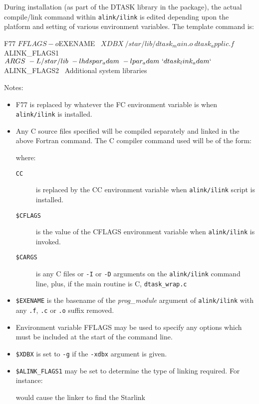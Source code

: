 \documentclass[twoside,11pt,nolof]{starlink}
\begin{document}
During installation (as part of the DTASK library in the
package), the actual compile/link command within \texttt{alink/ilink} is edited
depending upon the platform and setting of various environment variables.
The template command is:
\begin{terminalv}
F77 $FFLAGS -o $EXENAME \
$XDBX \
/star/lib/dtask_main.o \
dtask_applic.f \
$ALINK_FLAGS1 \
$ARGS \
-L/star/lib \
-lhdspar_adam \
-lpar_adam \
`dtask_link_adam` \
$ALINK_FLAGS2 \
Additional system libraries
\end{terminalv}
Notes:
\begin{itemize}
\item F77 is replaced by whatever the FC environment variable is when
\texttt{alink/ilink} is installed.
\item Any C source files specified will be compiled separately and linked in
the above Fortran command.  The C compiler command used will be of the form:
\begin{terminalv}
\end{terminalv}
where:
\begin{description}
\item[\texttt{CC}] is replaced by the CC environment variable when
\texttt{alink/ilink} script is installed.
\item[\texttt{\$CFLAGS}] is the value of the CFLAGS environment variable when
\texttt{alink/ilink} is invoked.
\item[\texttt{\$CARGS}] is any C files or \texttt{-I} or \texttt{-D} arguments
on the \texttt{alink/ilink} command line, plus, if the main routine is C,
\texttt{dtask\_wrap.c}\end{description}
\item \texttt{\$EXENAME} is the basename of the \textit{prog\_module}
argument of \texttt{alink/ilink} with any \texttt{.f}, \texttt{.c} or
\texttt{.o} suffix removed.
\item Environment variable FFLAGS may be used to specify any options which
must be included at the start of the command line.
\item \texttt{\$XDBX} is set to \texttt{-g} if the \texttt{-xdbx} argument
is given.
\item \texttt{\$ALINK\_FLAGS1} may be set to determine the type of linking
required. For instance:
\begin{terminalv}
\end{terminalv}
would cause the linker to find the Starlink

\end{itemize}
\end{document}
